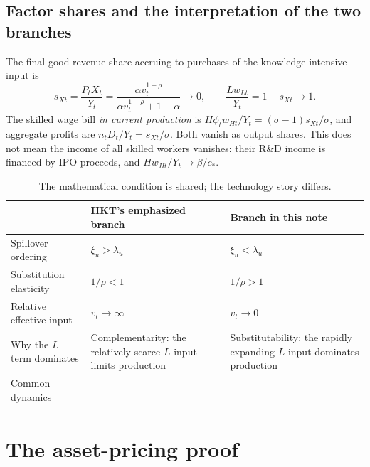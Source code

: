 \documentclass[11pt,a4paper]{article}
\newcommand{\asym}{\sim}
\begin{document}
\subsection{Factor shares and the interpretation of the two branches}
The final-good revenue share accruing to purchases of the knowledge-intensive
input is
\begin{equation}
s_{Xt}=\frac{P_tX_t}{Y_t}
=\frac{\alpha v_t^{1-\rho}}{\alpha v_t^{1-\rho}+1-\alpha}\longrightarrow0,
\qquad
\frac{Lw_{Lt}}{Y_t}=1-s_{Xt}\longrightarrow1.\label{eq:shares}
\end{equation}
The skilled wage bill \emph{in current production} is
$H\phi_t w_{Ht}/Y_t=(\sigma-1)s_{Xt}/\sigma$, and aggregate profits are
$n_tD_t/Y_t=s_{Xt}/\sigma$. Both vanish as output shares. This does not mean
the income of all skilled workers vanishes: their R\&D income is financed by
IPO proceeds, and $Hw_{Ht}/Y_t\to\beta/c_*$.

\begin{table}[htbp]
\centering\small
\caption{The mathematical condition is shared; the technology story differs.}
\begin{tabularx}{\textwidth}{@{}l>{\raggedright\arraybackslash}X>{\raggedright\arraybackslash}X@{}}
\toprule
 & HKT's emphasized branch & Branch in this note\\
\midrule
Spillover ordering & $\xi_u>\lambda_u$ & $\xi_u<\lambda_u$\\
Substitution elasticity & $1/\rho<1$ & $1/\rho>1$\\
Relative effective input & $v_t\to\infty$ & $v_t\to0$\\
Why the $L$ term dominates & Complementarity: the relatively scarce $L$ input limits production & Substitutability: the rapidly expanding $L$ input dominates production\\
Common dynamics & \multicolumn{2}{l}{$\kappa>0$, $\phi_t\to0$, $Y_t\asym C_Yn_t^{\lambda_u}$, $Q_t/D_t\to\infty$}\\
\bottomrule
\end{tabularx}
\end{table}

\section{The asset-pricing proof}
\end{document}
